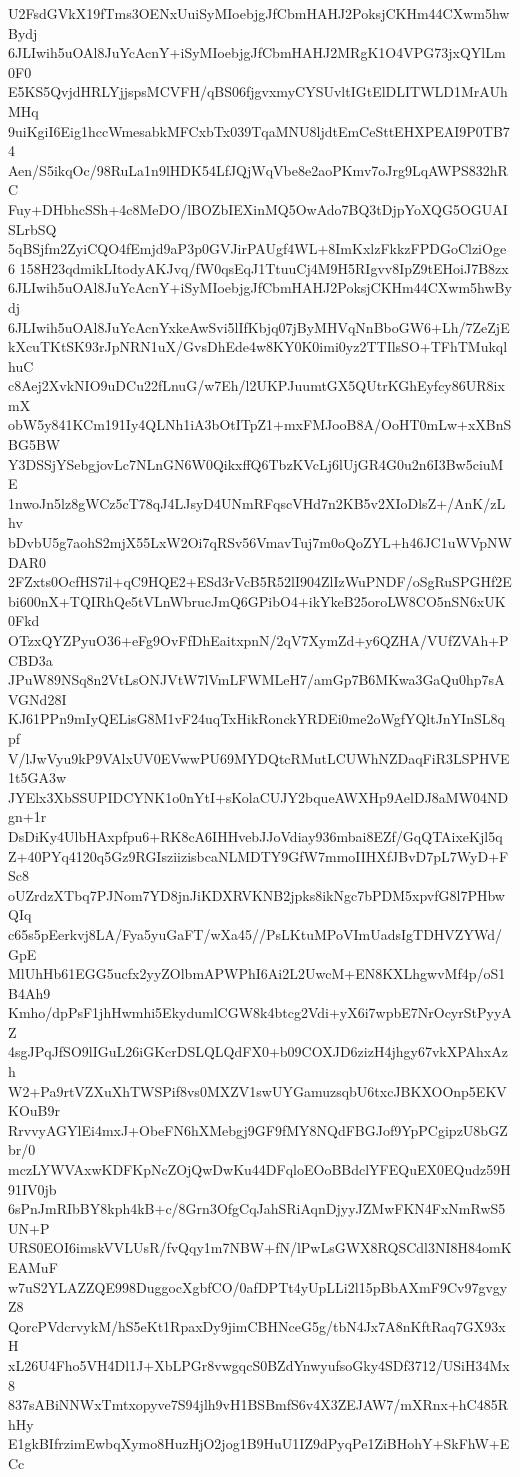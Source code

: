 U2FsdGVkX19fTms3OENxUuiSyMIoebjgJfCbmHAHJ2PoksjCKHm44CXwm5hwBydj
6JLIwih5uOAl8JuYcAcnY+iSyMIoebjgJfCbmHAHJ2MRgK1O4VPG73jxQYlLm0F0
E5KS5QvjdHRLYjjspsMCVFH/qBS06fjgvxmyCYSUvltIGtElDLITWLD1MrAUhMHq
9uiKgiI6Eig1hccWmesabkMFCxbTx039TqaMNU8ljdtEmCeSttEHXPEAI9P0TB74
Aen/S5ikqOc/98RuLa1n9lHDK54LfJQjWqVbe8e2aoPKmv7oJrg9LqAWPS832hRC
Fuy+DHbhcSSh+4c8MeDO/lBOZbIEXinMQ5OwAdo7BQ3tDjpYoXQG5OGUAISLrbSQ
5qBSjfm2ZyiCQO4fEmjd9aP3p0GVJirPAUgf4WL+8ImKxlzFkkzFPDGoClziOge6
158H23qdmikLItodyAKJvq/fW0qsEqJ1TtuuCj4M9H5RIgvv8IpZ9tEHoiJ7B8zx
6JLIwih5uOAl8JuYcAcnY+iSyMIoebjgJfCbmHAHJ2PoksjCKHm44CXwm5hwBydj
6JLIwih5uOAl8JuYcAcnYxkeAwSvi5lIfKbjq07jByMHVqNnBboGW6+Lh/7ZeZjE
kXcuTKtSK93rJpNRN1uX/GvsDhEde4w8KY0K0imi0yz2TTIlsSO+TFhTMukqlhuC
c8Aej2XvkNIO9uDCu22fLnuG/w7Eh/l2UKPJuumtGX5QUtrKGhEyfcy86UR8ixmX
obW5y841KCm191Iy4QLNh1iA3bOtITpZ1+mxFMJooB8A/OoHT0mLw+xXBnSBG5BW
Y3DSSjYSebgjovLc7NLnGN6W0QikxffQ6TbzKVcLj6lUjGR4G0u2n6I3Bw5ciuME
1nwoJn5lz8gWCz5cT78qJ4LJsyD4UNmRFqscVHd7n2KB5v2XIoDlsZ+/AnK/zLhv
bDvbU5g7aohS2mjX55LxW2Oi7qRSv56VmavTuj7m0oQoZYL+h46JC1uWVpNWDAR0
2FZxts0OcfHS7il+qC9HQE2+ESd3rVcB5R52lI904ZlIzWuPNDF/oSgRuSPGHf2E
bi600nX+TQIRhQe5tVLnWbrucJmQ6GPibO4+ikYkeB25oroLW8CO5nSN6xUK0Fkd
OTzxQYZPyuO36+eFg9OvFfDhEaitxpnN/2qV7XymZd+y6QZHA/VUfZVAh+PCBD3a
JPuW89NSq8n2VtLsONJVtW7lVmLFWMLeH7/amGp7B6MKwa3GaQu0hp7sAVGNd28I
KJ61PPn9mIyQELisG8M1vF24uqTxHikRonckYRDEi0me2oWgfYQltJnYInSL8qpf
V/lJwVyu9kP9VAlxUV0EVwwPU69MYDQtcRMutLCUWhNZDaqFiR3LSPHVE1t5GA3w
JYElx3XbSSUPIDCYNK1o0nYtI+sKolaCUJY2bqueAWXHp9AelDJ8aMW04NDgn+1r
DsDiKy4UlbHAxpfpu6+RK8cA6IHHvebJJoVdiay936mbai8EZf/GqQTAixeKjl5q
Z+40PYq4120q5Gz9RGIsziizisbcaNLMDTY9GfW7mmoIIHXfJBvD7pL7WyD+FSc8
oUZrdzXTbq7PJNom7YD8jnJiKDXRVKNB2jpks8ikNgc7bPDM5xpvfG8l7PHbwQIq
c65s5pEerkvj8LA/Fya5yuGaFT/wXa45//PsLKtuMPoVImUadsIgTDHVZYWd/GpE
MlUhHb61EGG5ucfx2yyZOlbmAPWPhI6Ai2L2UwcM+EN8KXLhgwvMf4p/oS1B4Ah9
Kmho/dpPsF1jhHwmhi5EkydumlCGW8k4btcg2Vdi+yX6i7wpbE7NrOcyrStPyyAZ
4sgJPqJfSO9lIGuL26iGKcrDSLQLQdFX0+b09COXJD6zizH4jhgy67vkXPAhxAzh
W2+Pa9rtVZXuXhTWSPif8vs0MXZV1swUYGamuzsqbU6txcJBKXOOnp5EKVKOuB9r
RrvvyAGYlEi4mxJ+ObeFN6hXMebgj9GF9fMY8NQdFBGJof9YpPCgipzU8bGZbr/0
mczLYWVAxwKDFKpNcZOjQwDwKu44DFqloEOoBBdclYFEQuEX0EQudz59H91IV0jb
6sPnJmRIbBY8kph4kB+c/8Grn3OfgCqJahSRiAqnDjyyJZMwFKN4FxNmRwS5UN+P
URS0EOI6imskVVLUsR/fvQqy1m7NBW+fN/lPwLsGWX8RQSCdl3NI8H84omKEAMuF
w7uS2YLAZZQE998DuggocXgbfCO/0afDPTt4yUpLLi2l15pBbAXmF9Cv97gvgyZ8
QorcPVdcrvykM/hS5eKt1RpaxDy9jimCBHNceG5g/tbN4Jx7A8nKftRaq7GX93xH
xL26U4Fho5VH4Dl1J+XbLPGr8vwgqcS0BZdYnwyufsoGky4SDf3712/USiH34Mx8
837sABiNNWxTmtxopyve7S94jlh9vH1BSBmfS6v4X3ZEJAW7/mXRnx+hC485RhHy
E1gkBIfrzimEwbqXymo8HuzHjO2jog1B9HuU1IZ9dPyqPe1ZiBHohY+SkFhW+ECc
